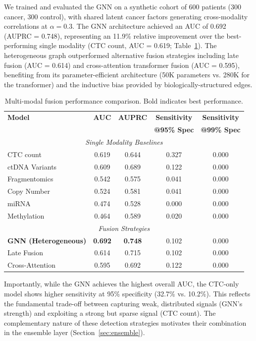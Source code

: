 \documentclass[10pt,a4paper]{article}
\begin{document}
We trained and evaluated the GNN on a synthetic cohort of 600 patients (300 cancer, 300 control), with shared latent cancer factors generating cross-modality correlations at $\alpha = 0.3$. The GNN architecture achieved an AUC of 0.692 (AUPRC = 0.748), representing an 11.9\% relative improvement over the best-performing single modality (CTC count, AUC = 0.619; Table~\ref{tab:fusion_performance}). The heterogeneous graph outperformed alternative fusion strategies including late fusion (AUC = 0.614) and cross-attention transformer fusion (AUC = 0.595), benefiting from its parameter-efficient architecture (50K parameters vs. 280K for the transformer) and the inductive bias provided by biologically-structured edges.

\begin{table}[H]
\centering
\caption{Multi-modal fusion performance comparison. Bold indicates best performance.}
\label{tab:fusion_performance}
\begin{tabular}{l c c c c}
\toprule
\textbf{Model} & \textbf{AUC} & \textbf{AUPRC} & \textbf{Sensitivity} & \textbf{Sensitivity} \\
 & & & \textbf{@95\% Spec} & \textbf{@99\% Spec} \\
\midrule
\multicolumn{5}{c}{\textit{Single Modality Baselines}} \\
\midrule
CTC count & 0.619 & 0.644 & 0.327 & 0.000 \\
ctDNA Variants & 0.609 & 0.689 & 0.122 & 0.000 \\
Fragmentomics & 0.542 & 0.575 & 0.041 & 0.000 \\
Copy Number & 0.524 & 0.581 & 0.041 & 0.000 \\
miRNA & 0.474 & 0.528 & 0.000 & 0.000 \\
Methylation & 0.464 & 0.589 & 0.020 & 0.000 \\
\midrule
\multicolumn{5}{c}{\textit{Fusion Strategies}} \\
\midrule
\textbf{GNN (Heterogeneous)} & \textbf{0.692} & \textbf{0.748} & 0.102 & 0.000 \\
Late Fusion & 0.614 & 0.715 & 0.102 & 0.000 \\
Cross-Attention & 0.595 & 0.692 & 0.122 & 0.000 \\
\bottomrule
\end{tabular}
\end{table}

Importantly, while the GNN achieves the highest overall AUC, the CTC-only model shows higher sensitivity at 95\% specificity (32.7\% vs. 10.2\%). This reflects the fundamental trade-off between capturing weak, distributed signals (GNN's strength) and exploiting a strong but sparse signal (CTC count). The complementary nature of these detection strategies motivates their combination in the ensemble layer (Section~\ref{sec:ensemble}).
\end{document}
